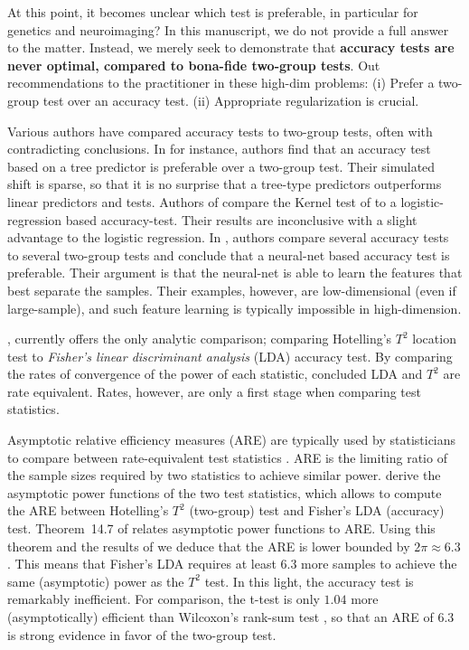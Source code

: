 \documentclass[journal]{IEEEtran}
\begin{document}
At this point, it becomes unclear which test is preferable, in particular for genetics and neuroimaging?
In this manuscript, we do not provide a full answer to the matter.
Instead, we merely seek to demonstrate that \textbf{accuracy tests are never optimal, compared to bona-fide two-group tests}.
Out recommendations to the practitioner in these high-dim problems:
(i) Prefer a two-group test over an accuracy test. 
(ii) Appropriate regularization is crucial. 

Various authors have compared accuracy tests to two-group tests, often with contradicting conclusions.
In \cite{yu2007two} for instance, authors find that an accuracy test based on a tree predictor is preferable over a two-group test. 
Their simulated shift is sparse, so that it is no surprise that a tree-type predictors outperforms linear predictors and tests. 
Authors of \cite{olivetti2013kernel} compare the Kernel test of \cite{gretton_kernel_2012-1} to a logistic-regression based accuracy-test. 
Their results are inconclusive with a slight advantage to the logistic regression.
In \cite{lopez2016revisiting}, authors compare several accuracy tests to several two-group tests and conclude that a neural-net based accuracy test is preferable. 
Their argument is that the neural-net is able to learn the features that best separate the samples. Their examples, however, are low-dimensional (even if large-sample), and such feature learning is typically impossible in high-dimension.

\cite{ramdas_classification_2016}, currently offers the only analytic comparison; comparing Hotelling's $T^2$ location test to \emph{Fisher's linear discriminant analysis} (LDA) accuracy test. 
By comparing the rates of convergence of the power of each statistic, \cite{ramdas_classification_2016} concluded LDA and $T^2$ are rate equivalent. 
Rates, however, are only a first stage when comparing test statistics. 

Asymptotic relative efficiency measures (ARE) are typically used by statisticians to compare between rate-equivalent test statistics \cite{vaart_asymptotic_1998}.
ARE is the limiting ratio of the sample sizes required by two statistics to achieve similar power. 
\cite{ramdas_classification_2016} derive the asymptotic power functions of the two test statistics, which allows to compute the ARE between Hotelling's $T^2$ (two-group) test and Fisher's LDA (accuracy) test.
Theorem~14.7 of \cite{vaart_asymptotic_1998} relates asymptotic power functions to ARE.
Using this theorem and the results of \cite{ramdas_classification_2016} we deduce that the ARE is lower bounded by $2 \pi \approx 6.3$. 
This means that Fisher's LDA requires at least $6.3$ more samples to achieve the same (asymptotic) power as the $T^2$ test. 
In this light, the accuracy test is remarkably inefficient.  
For comparison, the t-test is only $1.04$ more (asymptotically) efficient than Wilcoxon's rank-sum test \cite{lehmann_parametric_2009}, so that an ARE of $6.3$ is strong evidence in favor of the two-group test. 
\end{document}
